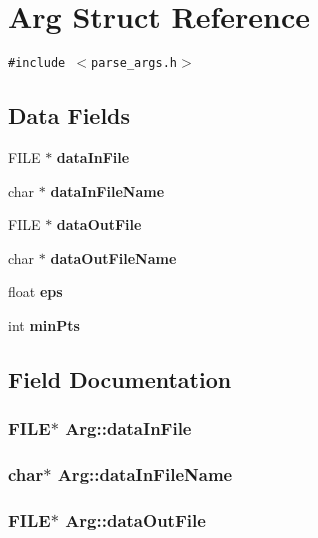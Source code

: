 \section{Arg Struct Reference}
\label{structArg}
{\tt \#include $<$parse\_\-args.h$>$}

\subsection*{Data Fields}
\begin{CompactItemize}
\item 
FILE $\ast$ {\bf dataInFile}
\item 
char $\ast$ {\bf dataInFileName}
\item 
FILE $\ast$ {\bf dataOutFile}
\item 
char $\ast$ {\bf dataOutFileName}
\item 
float {\bf eps}
\item 
int {\bf minPts}
\end{CompactItemize}


\subsection{Field Documentation}
\subsubsection{\setlength{\rightskip}{0pt plus 5cm}FILE$\ast$ {\bf Arg::dataInFile}}\label{structArg_423807c77057bd9d25b0069f3ee7d3a5}


\subsubsection{\setlength{\rightskip}{0pt plus 5cm}char$\ast$ {\bf Arg::dataInFileName}}\label{structArg_0bf213bc1894378d1f9b19d5c7274c3e}


\subsubsection{\setlength{\rightskip}{0pt plus 5cm}FILE$\ast$ {\bf Arg::dataOutFile}}\label{structArg_8c21ba85a3fd02a064eb5ad56458cd2a}


